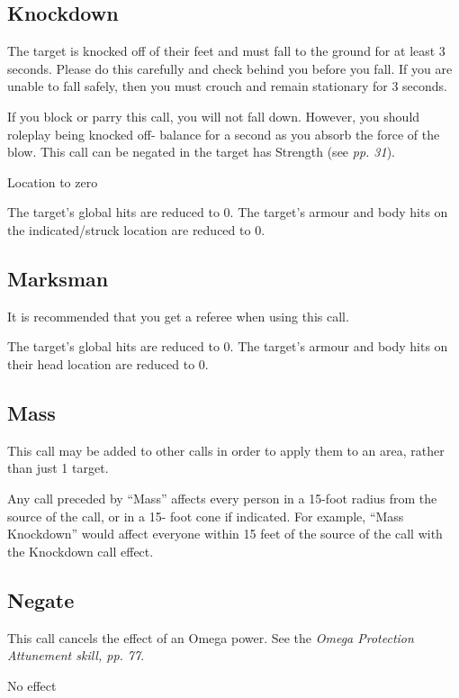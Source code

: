 \documentclass{scrbook}
\begin{document}
 

\subsection{Knockdown}

The target is knocked off of their feet and must fall to the ground for at least 3 seconds. Please do this carefully and check behind you before you fall. If you are unable to fall safely, then you must crouch and remain stationary for 3 seconds.

If you block or parry this call, you will not fall down. However, you should roleplay being knocked off- balance for a second as you absorb the force of the blow. This call can be negated in the target has Strength (see \textit{pp. 31}).

Location to zero

The target's global hits are reduced to 0. The target's armour and body hits on the indicated/struck location are reduced to 0.

\subsection{Marksman}

It is recommended that you get a referee when using this call.

The target's global hits are reduced to 0. The target's armour and body hits on their head location are reduced to 0.

\subsection{Mass}

This call may be added to other calls in order to apply them to an area, rather than just 1 target.

Any call preceded by ``Mass'' affects every person in a 15-foot radius from the source of the call, or in a 15- foot cone if indicated. For example, ``Mass Knockdown'' would affect everyone within 15 feet of the source of the call with the Knockdown call effect.

\subsection{Negate}

This call cancels the effect of an Omega power. See the \textit{Omega Protection Attunement skill, pp. 77}.

No effect
\end{document}
